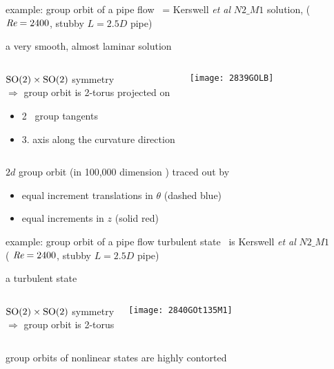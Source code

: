 \begin{frame}{example: group orbit of a pipe flow  \reqv}
{\scriptsize
\slicep\ = Kerswell \emph{et al} $N2\_M1$ solution,
($\textit{Re} =2400$, stubby $L=2.5D$ pipe)
}

\medskip

a very smooth, almost laminar solution

	\begin{columns}[t]
			\begin{exampleblock}
{$\textrm{SO}(2)\times\textrm{SO}(2)$ symmetry
\\
$\Rightarrow$
group orbit is 2-torus}
projected on
  \begin{itemize}
    \item 2 \slicep\ group tangents
    \item 3. axis along the curvature direction
  \end{itemize}
			\end{exampleblock}
	\column{0.55\textwidth}
\begin{block}
  \centering
\texttt{[image: 2839GOLB]} %
\end{block}
	\end{columns}

\bigskip
{\scriptsize
$2d$ group orbit (in 100,000 dimension \textcolor{red}{\statesp}) traced out by
  \begin{itemize}
    \item equal increment translations in $\theta$ (dashed blue)
    \item equal increments in $z$ (solid red)
  \end{itemize}
}
\end{frame}

\begin{frame}{example: group orbit of a pipe flow turbulent state}
{\scriptsize
\slicep\ is Kerswell \emph{et al} $N2\_M1$  \reqv
\\
( $\textit{Re} =2400$,
stubby $L=2.5D$ pipe)
}

\medskip

a turbulent state


	\begin{columns}[t]
	\column{.45\textwidth}
			\begin{exampleblock}
{$\textrm{SO}(2)\times\textrm{SO}(2)$ symmetry
\\
$\Rightarrow$
group orbit is 2-torus}
			\end{exampleblock}
\begin{block}
  \centering
\texttt{[image: 2840GOt135M1]} %
\end{block}
	\end{columns}

\bigskip
group orbits of nonlinear states are highly contorted
\end{frame}

